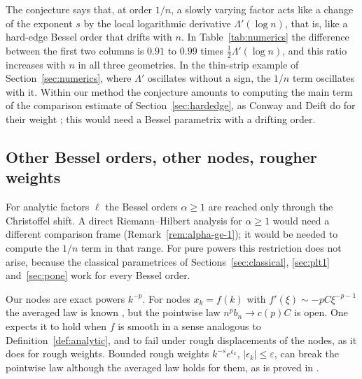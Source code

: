 The conjecture says that, at order $1/n$, a slowly varying factor acts like a change of the exponent $s$ by the local
logarithmic derivative $\Lambda'(\log n)$, that is, like a hard-edge Bessel order that drifts with $n$. In
Table~\ref{tab:numerics} the difference between the first two columns is $0.91$ to $0.99$ times
$\frac12\Lambda'(\log n)$, and this ratio increases with $n$ in all three geometries. In the thin-strip example of
Section~\ref{sec:numerics}, where $\Lambda'$ oscillates without a sign, the $1/n$ term oscillates with it. Within our
method the conjecture amounts to computing the main term of the comparison estimate of Section~\ref{sec:hardedge}, as
Conway and Deift do for their weight \cite[(5.5)]{CD}; this would need a Bessel parametrix with a drifting order.

\subsection{Other Bessel orders, other nodes, rougher weights}\label{sec:nodes}
For analytic factors $\ell$ the Bessel orders $\alpha\ge1$ are reached only through the Christoffel shift. A direct
Riemann--Hilbert analysis for $\alpha\ge1$ would need a different comparison frame (Remark~\ref{rem:alpha-ge-1}); it
would be needed to compute the $1/n$ term in that range. For pure powers this restriction does not arise, because the
classical parametrices of Sections~\ref{sec:classical}, \ref{sec:plt1} and~\ref{sec:pone} work for every Bessel order.

Our nodes are exact powers $k^{-p}$. For nodes $x_k=f(k)$ with $f'(\xi)\sim-pC\xi^{-p-1}$ the averaged law is known
\cite[Corollary~1.2]{Paper1}, but the pointwise law $n^pb_n\to c(p)C$ is open. One expects it to hold when $f$ is smooth
in a sense analogous to Definition~\ref{def:analytic}, and to fail under rough displacements of the nodes, as it does
for rough weights. Bounded rough weights $k^{-s}e^{\epsilon_k}$, $|\epsilon_k|\le\varepsilon$, can break the pointwise
law although the averaged law holds for them, as is proved in \cite{Paper3}.
